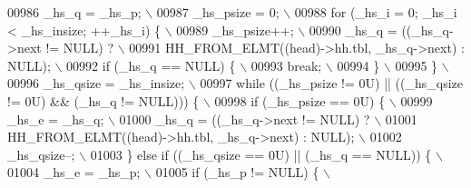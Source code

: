 \begin{DoxyCode}
{{{{{{{{{00986 \textcolor{preprocessor}{        \_hs\_q = \_hs\_p;                                                           \(\backslash\)}
00987 \textcolor{preprocessor}{        \_hs\_psize = 0;                                                           \(\backslash\)}
00988 \textcolor{preprocessor}{        for (\_hs\_i = 0; \_hs\_i < \_hs\_insize; ++\_hs\_i) \{                           \(\backslash\)}
00989 \textcolor{preprocessor}{          \_hs\_psize++;                                                           \(\backslash\)}
00990 \textcolor{preprocessor}{          \_hs\_q = ((\_hs\_q->next != NULL) ?                                       \(\backslash\)}
00991 \textcolor{preprocessor}{            HH\_FROM\_ELMT((head)->hh.tbl, \_hs\_q->next) : NULL);                   \(\backslash\)}
00992 \textcolor{preprocessor}{          if (\_hs\_q == NULL) \{                                                   \(\backslash\)}
00993 \textcolor{preprocessor}{            break;                                                               \(\backslash\)}
00994 \textcolor{preprocessor}{          \}                                                                      \(\backslash\)}
00995 \textcolor{preprocessor}{        \}                                                                        \(\backslash\)}
00996 \textcolor{preprocessor}{        \_hs\_qsize = \_hs\_insize;                                                  \(\backslash\)}
00997 \textcolor{preprocessor}{        while ((\_hs\_psize != 0U) || ((\_hs\_qsize != 0U) && (\_hs\_q != NULL))) \{    \(\backslash\)}
00998 \textcolor{preprocessor}{          if (\_hs\_psize == 0U) \{                                                 \(\backslash\)}
00999 \textcolor{preprocessor}{            \_hs\_e = \_hs\_q;                                                       \(\backslash\)}
01000 \textcolor{preprocessor}{            \_hs\_q = ((\_hs\_q->next != NULL) ?                                     \(\backslash\)}
01001 \textcolor{preprocessor}{              HH\_FROM\_ELMT((head)->hh.tbl, \_hs\_q->next) : NULL);                 \(\backslash\)}
01002 \textcolor{preprocessor}{            \_hs\_qsize--;                                                         \(\backslash\)}
01003 \textcolor{preprocessor}{          \} else if ((\_hs\_qsize == 0U) || (\_hs\_q == NULL)) \{                     \(\backslash\)}
01004 \textcolor{preprocessor}{            \_hs\_e = \_hs\_p;                                                       \(\backslash\)}
01005 \textcolor{preprocessor}{            if (\_hs\_p != NULL) \{                                                 \(\backslash\)}
}}}}}}}}}
\end{DoxyCode}
